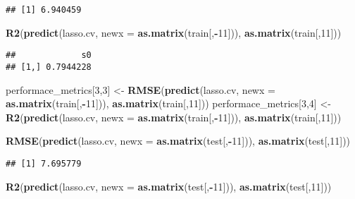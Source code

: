 \documentclass[
]{article}
\newenvironment{Shaded}{\begin{snugshade}}{\end{snugshade}}
\newcommand{\DataTypeTok}[1]{\textcolor[rgb]{0.13,0.29,0.53}{#1}}
\newcommand{\DecValTok}[1]{\textcolor[rgb]{0.00,0.00,0.81}{#1}}
\newcommand{\KeywordTok}[1]{\textcolor[rgb]{0.13,0.29,0.53}{\textbf{#1}}}
\newcommand{\NormalTok}[1]{#1}
\newcommand{\OperatorTok}[1]{\textcolor[rgb]{0.81,0.36,0.00}{\textbf{#1}}}
\newcommand{\StringTok}[1]{\textcolor[rgb]{0.31,0.60,0.02}{#1}}
\begin{document}
\begin{verbatim}
## [1] 6.940459
\end{verbatim}

\begin{Shaded}
\begin{Highlighting}[]
\KeywordTok{R2}\NormalTok{(}\KeywordTok{predict}\NormalTok{(lasso.cv, }\DataTypeTok{newx =} \KeywordTok{as.matrix}\NormalTok{(train[,}\OperatorTok{-}\DecValTok{11}\NormalTok{])), }\KeywordTok{as.matrix}\NormalTok{(train[,}\DecValTok{11}\NormalTok{]))}
\end{Highlighting}
\end{Shaded}

\begin{verbatim}
##             s0
## [1,] 0.7944228
\end{verbatim}

\begin{Shaded}
\begin{Highlighting}[]
\NormalTok{performace_metrics[}\DecValTok{3}\NormalTok{,}\DecValTok{3}\NormalTok{] <-}\StringTok{ }\KeywordTok{RMSE}\NormalTok{(}\KeywordTok{predict}\NormalTok{(lasso.cv, }\DataTypeTok{newx =} \KeywordTok{as.matrix}\NormalTok{(train[,}\OperatorTok{-}\DecValTok{11}\NormalTok{])), }\KeywordTok{as.matrix}\NormalTok{(train[,}\DecValTok{11}\NormalTok{]))}
\NormalTok{performace_metrics[}\DecValTok{3}\NormalTok{,}\DecValTok{4}\NormalTok{] <-}\StringTok{ }\KeywordTok{R2}\NormalTok{(}\KeywordTok{predict}\NormalTok{(lasso.cv, }\DataTypeTok{newx =} \KeywordTok{as.matrix}\NormalTok{(train[,}\OperatorTok{-}\DecValTok{11}\NormalTok{])), }\KeywordTok{as.matrix}\NormalTok{(train[,}\DecValTok{11}\NormalTok{]))}

\KeywordTok{RMSE}\NormalTok{(}\KeywordTok{predict}\NormalTok{(lasso.cv, }\DataTypeTok{newx =} \KeywordTok{as.matrix}\NormalTok{(test[,}\OperatorTok{-}\DecValTok{11}\NormalTok{])), }\KeywordTok{as.matrix}\NormalTok{(test[,}\DecValTok{11}\NormalTok{]))}
\end{Highlighting}
\end{Shaded}

\begin{verbatim}
## [1] 7.695779
\end{verbatim}

\begin{Shaded}
\begin{Highlighting}[]
\KeywordTok{R2}\NormalTok{(}\KeywordTok{predict}\NormalTok{(lasso.cv, }\DataTypeTok{newx =} \KeywordTok{as.matrix}\NormalTok{(test[,}\OperatorTok{-}\DecValTok{11}\NormalTok{])), }\KeywordTok{as.matrix}\NormalTok{(test[,}\DecValTok{11}\NormalTok{]))}
\end{Highlighting}
\end{Shaded}
\end{document}
